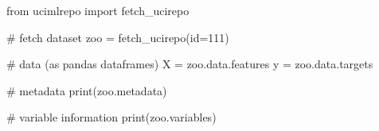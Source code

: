 \documentclass[
  letterpaper,
]{krantz}
\makeatletter
\newenvironment{Shaded}{\begin{snugshade}}{\end{snugshade}}
\newcommand{\BuiltInTok}[1]{\textcolor[rgb]{0.00,0.23,0.31}{#1}}
\newcommand{\CommentTok}[1]{\textcolor[rgb]{0.37,0.37,0.37}{#1}}
\newcommand{\DecValTok}[1]{\textcolor[rgb]{0.68,0.00,0.00}{#1}}
\newcommand{\ImportTok}[1]{\textcolor[rgb]{0.00,0.46,0.62}{#1}}
\newcommand{\NormalTok}[1]{\textcolor[rgb]{0.00,0.23,0.31}{#1}}
\newcommand{\OperatorTok}[1]{\textcolor[rgb]{0.37,0.37,0.37}{#1}}
\newenvironment{kframe}{%
\medskip{}
\setlength{\fboxsep}{.8em}
 \def\at@end@of@kframe{}%
 \ifinner\ifhmode%
  \def\at@end@of@kframe{\end{minipage}}%
  \begin{minipage}{\columnwidth}%
 \fi\fi%
 \def\FrameCommand##1{\hskip\@totalleftmargin \hskip-\fboxsep
 \colorbox{shadecolor}{##1}\hskip-\fboxsep
     \hskip-\linewidth \hskip-\@totalleftmargin \hskip\columnwidth}%
 \MakeFramed {\advance\hsize-\width
   \@totalleftmargin\z@ \linewidth\hsize
   \@setminipage}}%
 {\par\unskip\endMakeFramed%
 \at@end@of@kframe}
\renewenvironment{Shaded}{\begin{kframe}}{\end{kframe}}
\makeatother
\begin{document}
\begin{Shaded}
\begin{Highlighting}[]
\ImportTok{from}\NormalTok{ ucimlrepo }\ImportTok{import}\NormalTok{ fetch\_ucirepo}

\CommentTok{\# fetch dataset}
\NormalTok{zoo }\OperatorTok{=}\NormalTok{ fetch\_ucirepo(}\BuiltInTok{id}\OperatorTok{=}\DecValTok{111}\NormalTok{)}

\CommentTok{\# data (as pandas dataframes)}
\NormalTok{X }\OperatorTok{=}\NormalTok{ zoo.data.features}
\NormalTok{y }\OperatorTok{=}\NormalTok{ zoo.data.targets}


\CommentTok{\# metadata}
\BuiltInTok{print}\NormalTok{(zoo.metadata)}

\CommentTok{\# variable information}
\BuiltInTok{print}\NormalTok{(zoo.variables)}
\end{Highlighting}
\end{Shaded}
\end{document}
